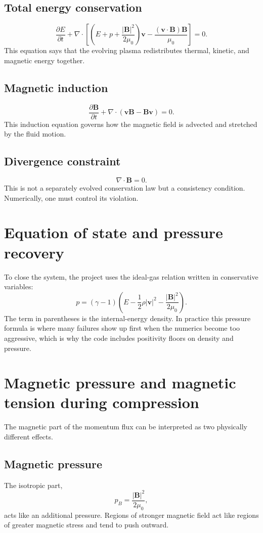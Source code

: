 \documentclass[11pt]{article}
\begin{document}
\subsection{Total energy conservation}
\[
\frac{\partial E}{\partial t} + \nabla\cdot\left[\left(E+p+\frac{|\mathbf{B}|^2}{2\mu_0}\right)\mathbf{v} - \frac{(\mathbf{v}\cdot\mathbf{B})\mathbf{B}}{\mu_0}\right] = 0.
\]
This equation says that the evolving plasma redistributes thermal, kinetic, and magnetic energy together.

\subsection{Magnetic induction}
\[
\frac{\partial \mathbf{B}}{\partial t} + \nabla\cdot(\mathbf{v}\mathbf{B}-\mathbf{B}\mathbf{v}) = 0.
\]
This induction equation governs how the magnetic field is advected and stretched by the fluid motion.

\subsection{Divergence constraint}
\[
\nabla\cdot\mathbf{B} = 0.
\]
This is not a separately evolved conservation law but a consistency condition. Numerically, one must control its violation.

\section{Equation of state and pressure recovery}
To close the system, the project uses the ideal-gas relation written in conservative variables:
\[
p = (\gamma-1)\left(E - \frac{1}{2}\rho |\mathbf{v}|^2 - \frac{|\mathbf{B}|^2}{2\mu_0}\right).
\]
The term in parentheses is the internal-energy density. In practice this pressure formula is where many failures show up first when the numerics become too aggressive, which is why the code includes positivity floors on density and pressure.

\section{Magnetic pressure and magnetic tension during compression}
The magnetic part of the momentum flux can be interpreted as two physically different effects.

\subsection{Magnetic pressure}
The isotropic part,
\[
p_B = \frac{|\mathbf{B}|^2}{2\mu_0},
\]
acts like an additional pressure. Regions of stronger magnetic field act like regions of greater magnetic stress and tend to push outward.
\end{document}
